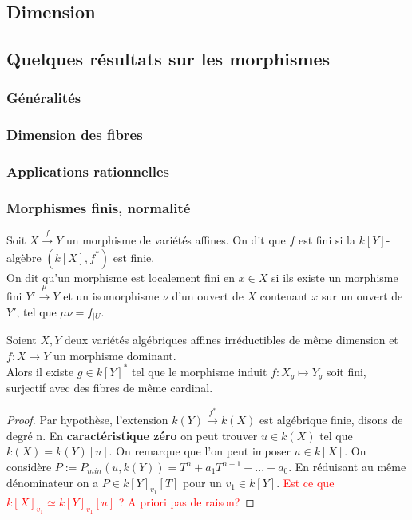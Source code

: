 \subsection{Dimension}
\subsection{Quelques résultats sur les morphismes}
\subsubsection{Généralités}

\subsubsection{Dimension des fibres}

\subsubsection{Applications rationnelles}

\subsubsection{Morphismes finis, normalité}

\begin{defn}
Soit $X \xrightarrow{f}Y$ un morphisme de variétés affines. On dit que $f$ est fini si la $k[Y]$-algèbre $(k[X], f^*)$ est finie.\\
On dit qu'un morphisme est localement fini en $x\in X$ si ils existe un morphisme fini $Y' \xrightarrow{\mu}Y$ et un isomorphisme $\nu$ d'un ouvert de $X$ contenant $x$ sur un ouvert de $Y'$, tel que $\mu\nu =f_{|U}$.
\end{defn}

\begin{prop}Soient $X,Y$ deux variétés algébriques affines irréductibles de même dimension et $f:X \mapsto Y$ un morphisme dominant.\\
Alors il existe $g\in k[Y]^*$ tel que le morphisme induit $f:X_g \mapsto Y_g$ soit fini, surjectif avec des fibres de même cardinal.
\end{prop}
\begin{proof}
Par hypothèse, l'extension $k(Y) \xrightarrow{f^*} k(X)$ est algébrique finie, disons de degré n. En \textbf{caractéristique zéro} on peut trouver $u\in k(X)$ tel que $k(X)=k(Y)[u]$. On remarque que l'on peut imposer $u\in k[X]$. On considère $P:=P_{min}(u, k(Y))=T^n+a_1T^{n-1}+...+a_0$. En réduisant au même dénominateur on a $P\in k[Y]_{v_1}[T]$ pour un $v_1\in k[Y]$. \textcolor{red}{Est ce que $k[X]_{v_1}\simeq k[Y]_{v_1}[u]$ ? A priori pas de raison?}
\end{proof}

